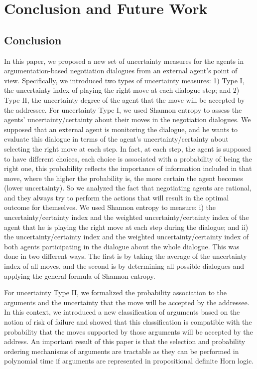 \setcounter{chapter}{3}

\chapter{Conclusion and Future Work}

\section{Conclusion}\label{sec:conclusion}
In this paper, we proposed a new set of uncertainty measures for the agents in argumentation-based negotiation dialogues from an
external agent's point of view. Specifically, we introduced two types of uncertainty measures: 1) Type I, the uncertainty index of
playing the right move at each dialogue step; and 2) Type II, the uncertainty degree of the agent that the move will be accepted by
the addressee.
For uncertainty Type I, we used Shannon entropy to assess the agents' uncertainty/certainty about their moves in the negotiation
dialogues. We supposed that an external agent is monitoring the dialogue, and he wants to evaluate this dialogue in terms of the
agent's uncertainty/certainty about selecting the right move at each step. In fact, at each step, the agent is supposed to have
different choices, each choice is associated with a probability of being the right one, %
this probability reflects the importance of information included in that move, where the higher the probability is, the
more certain the agent becomes (lower uncertainty). So we analyzed the fact that negotiating agents are rational, and they always
try to perform the actions that will result in the optimal outcome for themselves. We used Shannon entropy to measure: i) the
uncertainty/certainty index and the weighted uncertainty/certainty index of the agent that he is playing the right move at each
step during the dialogue; and ii) the uncertainty/certainty index and the weighted uncertainty/certainty index of both agents
participating in the dialogue about the whole dialogue. This was done in two different ways. The first is by taking the average of
the uncertainty index of all moves, and the second is by determining all possible dialogues and applying the general formula of Shannon entropy.

For uncertainty Type II, we formalized the probability association to the arguments and the uncertainty that the move will be
accepted by the addressee. In this context, we introduced a new classification of arguments based on the notion of risk of failure
and showed that this classification is compatible with the probability that the moves supported by those arguments will be
accepted by the address. An important result of this paper is that the selection and probability ordering mechanisms of arguments
are tractable as they can be performed in polynomial time if arguments are represented in propositional definite Horn logic.

